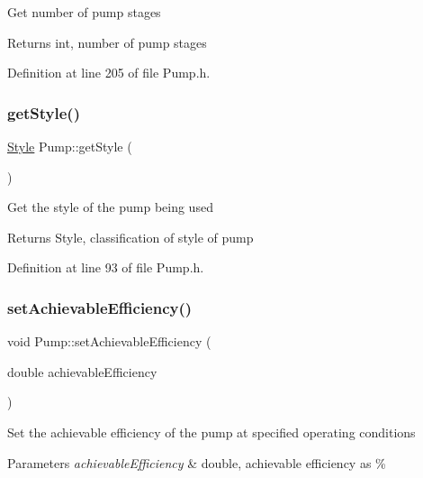 Get number of pump stages

\begin{DoxyReturn}{Returns}
int, number of pump stages 
\end{DoxyReturn}


Definition at line 205 of file Pump.\+h.

\mbox{\label{class_pump_ab75d877769b5232c5ab7b4d92940579a}} 
\subsubsection{\texorpdfstring{get\+Style()}{getStyle()}}
{\footnotesize\ttfamily \hyperlink{class_pump_aef354601ce4218258cc898b35a1e90ff}{Style} Pump\+::get\+Style (\begin{DoxyParamCaption}{ }\end{DoxyParamCaption})\hspace{0.3cm}{\ttfamily [inline]}}

Get the style of the pump being used

\begin{DoxyReturn}{Returns}
Style, classification of style of pump 
\end{DoxyReturn}


Definition at line 93 of file Pump.\+h.

\mbox{\label{class_pump_a183f83fcc4b77e330451000df4d91046}} 
\subsubsection{\texorpdfstring{set\+Achievable\+Efficiency()}{setAchievableEfficiency()}}
{\footnotesize\ttfamily void Pump\+::set\+Achievable\+Efficiency (\begin{DoxyParamCaption}\item[{double}]{achievable\+Efficiency }\end{DoxyParamCaption})\hspace{0.3cm}{\ttfamily [inline]}}

Set the achievable efficiency of the pump at specified operating conditions


\begin{DoxyParams}{Parameters}
{\em achievable\+Efficiency} & double, achievable efficiency as \% \\
\hline
\end{DoxyParams}


